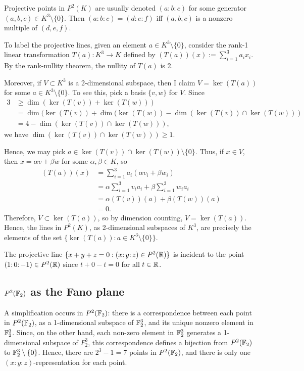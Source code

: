 \documentclass{article}
\begin{document}
Projective points in $P^2(K)$ are usually denoted $(a\mathpunct{:} b \mathpunct{:} c)$ for some generator $(a,b,c) \in K^3\setminus \{0\}$. Then $(a\mathpunct{:}b\mathpunct{:}c) = (d\mathpunct{:}e\mathpunct{:}f)$ iff $(a,b,c)$ is a nonzero multiple of $(d,e,f)$. 

To label the projective lines, given an element $a \in K^3\setminus \{0\}$, consider the rank-1 linear transformation $T(a):K^3 \to K$ defined by $(T(a))(x) := \sum_{i=1}^3 a_ix_i$.  By the rank-nullity theorem, the nullity of $T(a)$ is 2. 

Moreover, if $V \subset K^3$ is a 2-dimensional subspace, then I claim $V = \ker(T(a))$ for some $a \in K^3\setminus \{0\}$.   To see this, pick a basis $\{v, w\}$ for $V$. 
Since 
\begin{align*}
3 & \ge \dim(\ker(T(v)) + \ker(T(w))) 
\\ & = \dim(\ker(T(v)) + \dim(\ker(T(w)) - \dim(\ker(T(v)) \cap \ker(T(w)))  
\\ & = 4 - \dim(\ker(T(v)) \cap \ker(T(w))),
\end{align*}
 we have $\dim(\ker(T(v)) \cap \ker(T(w))) \ge 1$.

Hence, we may pick $a \in \ker(T(v)) \cap \ker(T(w)) \setminus \{0\}$.
Thus, if $x \in V$, then $x = \alpha v + \beta w$ for some $\alpha, \beta \in K$, so
\begin{align*}
(T(a))(x) & = \sum_{i=1}^3 a_i(\alpha v_i + \beta w_i)
\\ &  = \alpha \sum_{i=1}^3  v_i a_i + \beta \sum_{i=1}^3 w_i a_i 
\\ & = \alpha (T(v))(a) + \beta (T(w))(a) 
\\ & = 0.
\end{align*}
Therefore, $V \subset \ker(T(a))$, so by dimension counting, $V = \ker(T(a))$. Hence, the lines in $P^2(K)$, as 2-dimensional subspaces of $K^3$, are precisely the elements of the set $\{\ker(T(a)) : a \in K^3\setminus\{0\} \}$.

\begin{example}
The projective line $\{x+y+z=0: (x \mathpunct{:}y\mathpunct{:}z) \in P^2(\mathbb{R})\}$ is incident to the point $(1\mathpunct{:}0\mathpunct{:}-1) \in P^2(\mathbb{R})$ since $t+0-t = 0$ for all $t\in \mathbb{R}$.
\end{example}

\subsection{$P^2(\mathbb{F}_2)$ as the Fano plane}
A simplification occurs in $P^2(\mathbb{F}_2)$: there is a correspondence between each point in $P^2(\mathbb{F}_2)$, as a 1-dimensional subspace of $\mathbb{F}_2^3$, and its unique nonzero element in $\mathbb{F}_2^3$. Since, on the other hand, each non-zero element in $\mathbb{F}_2^3$ generates a 1-dimensional subspace of $F_2^3$, this correspondence defines a bijection from $P^2(\mathbb{F}_2)$ to $\mathbb{F}_2^3\setminus \{0\}$. Hence, there are $2^3 - 1 = 7$ points in $P^2(\mathbb{F}_2)$, and there is only one $(x \mathpunct{:}y\mathpunct{:}z)$-representation for each point.
\end{document}
